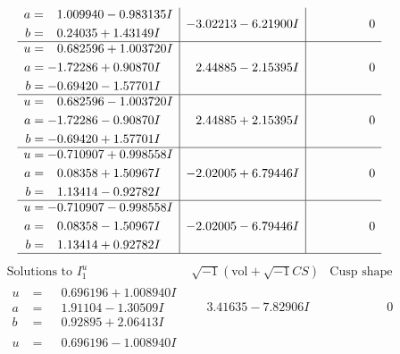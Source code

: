 \documentclass[1p]{elsarticle_modified}
\theoremstyle{definition}
\newcommand{\I}{\sqrt{-1}}
\begin{document}
$$\begin{array}{c|c|c}
\begin{aligned}
a &= \phantom{-}1.009940 - 0.983135 I \\
b &= \phantom{-}0.24035 + 1.43149 I\end{aligned}
 & -3.02213 - 6.21900 I & \phantom{-0.000000 } 0 \\ \hline\begin{aligned}
u &= \phantom{-}0.682596 + 1.003720 I \\
a &= -1.72286 + 0.90870 I \\
b &= -0.69420 - 1.57701 I\end{aligned}
 & \phantom{-}2.44885 - 2.15395 I & \phantom{-0.000000 } 0 \\ \hline\begin{aligned}
u &= \phantom{-}0.682596 - 1.003720 I \\
a &= -1.72286 - 0.90870 I \\
b &= -0.69420 + 1.57701 I\end{aligned}
 & \phantom{-}2.44885 + 2.15395 I & \phantom{-0.000000 } 0 \\ \hline\begin{aligned}
u &= -0.710907 + 0.998558 I \\
a &= \phantom{-}0.08358 + 1.50967 I \\
b &= \phantom{-}1.13414 - 0.92782 I\end{aligned}
 & -2.02005 + 6.79446 I & \phantom{-0.000000 } 0 \\ \hline\begin{aligned}
u &= -0.710907 - 0.998558 I \\
a &= \phantom{-}0.08358 - 1.50967 I \\
b &= \phantom{-}1.13414 + 0.92782 I\end{aligned}
 & -2.02005 - 6.79446 I & \phantom{-0.000000 } 0\\
 \hline 
 \end{array}$$\newpage$$\begin{array}{c|c|c}  
\text{Solutions to }I^u_{1}& \I (\text{vol} + \sqrt{-1}CS) & \text{Cusp shape}\\
 \hline 
\begin{aligned}
u &= \phantom{-}0.696196 + 1.008940 I \\
a &= \phantom{-}1.91104 - 1.30509 I \\
b &= \phantom{-}0.92895 + 2.06413 I\end{aligned}
 & \phantom{-}3.41635 - 7.82906 I & \phantom{-0.000000 } 0 \\ \hline\begin{aligned}
u &= \phantom{-}0.696196 - 1.008940 I \\

\end{aligned}
\end{array}$$
\end{document}
